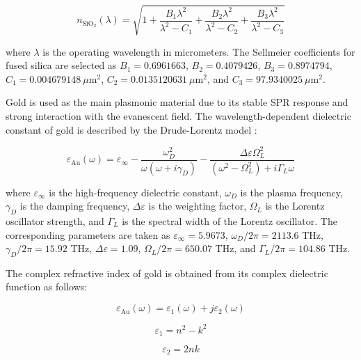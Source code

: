 \documentclass[preprint,12pt]{elsarticle}
\begin{document}
\begin{equation}
n_{\mathrm{SiO_2}}(\lambda)=
\sqrt{
1+\frac{B_1\lambda^2}{\lambda^2-C_1}
+\frac{B_2\lambda^2}{\lambda^2-C_2}
+\frac{B_3\lambda^2}{\lambda^2-C_3}
}
\label{eq:sellmeier_silica}
\end{equation}

where $\lambda$ is the operating wavelength in micrometers. The Sellmeier coefficients for fused silica are selected as $B_1=0.6961663$, $B_2=0.4079426$, $B_3=0.8974794$, $C_1=0.004679148~\mu\mathrm{m}^2$, $C_2=0.0135120631~\mu\mathrm{m}^2$, and $C_3=97.9340025~\mu\mathrm{m}^2$.

Gold is used as the main plasmonic material due to its stable SPR response and strong interaction with the evanescent field. The wavelength-dependent dielectric constant of gold is described by the Drude-Lorentz model \cite{ashrafian2025highly}:

\begin{equation}
\varepsilon_{\mathrm{Au}}(\omega)=
\varepsilon_{\infty}
-\frac{\omega_D^2}{\omega(\omega+i\gamma_D)}
-\frac{\Delta\varepsilon \Omega_L^2}
{(\omega^2-\Omega_L^2)+i\Gamma_L\omega}
\label{eq:gold_drude_lorentz}
\end{equation}

where $\varepsilon_{\infty}$ is the high-frequency dielectric constant, $\omega_D$ is the plasma frequency, $\gamma_D$ is the damping frequency, $\Delta\varepsilon$ is the weighting factor, $\Omega_L$ is the Lorentz oscillator strength, and $\Gamma_L$ is the spectral width of the Lorentz oscillator. The corresponding parameters are taken as $\varepsilon_{\infty}=5.9673$, $\omega_D/2\pi=2113.6$ THz, $\gamma_D/2\pi=15.92$ THz, $\Delta\varepsilon=1.09$, $\Omega_L/2\pi=650.07$ THz, and $\Gamma_L/2\pi=104.86$ THz.

The complex refractive index of gold is obtained from its complex dielectric function as follows:

\begin{equation}
\varepsilon_{\mathrm{Au}}(\omega)=\varepsilon_1(\omega)+j\varepsilon_2(\omega)
\label{eq:gold_complex_eps}
\end{equation}

\begin{equation}
\varepsilon_1=n^2-k^2
\label{eq:eps1}
\end{equation}

\begin{equation}
\varepsilon_2=2nk
\label{eq:eps2}
\end{equation}
\end{document}
